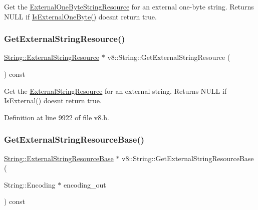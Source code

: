 Get the \mbox{\hyperlink{classv8_1_1String_1_1ExternalOneByteStringResource}{External\+One\+Byte\+String\+Resource}} for an external one-\/byte string. Returns N\+U\+LL if \mbox{\hyperlink{classv8_1_1String_a29b5d1786d906b84e10a5cab9451f976}{Is\+External\+One\+Byte()}} doesn\textquotesingle{}t return true. \mbox{\label{classv8_1_1String_ac751c8c239eb213a879204cab6787883}} 
\subsubsection{\texorpdfstring{Get\+External\+String\+Resource()}{GetExternalStringResource()}}
{\footnotesize\ttfamily \mbox{\hyperlink{classv8_1_1String_1_1ExternalStringResource}{String\+::\+External\+String\+Resource}} $\ast$ v8\+::\+String\+::\+Get\+External\+String\+Resource (\begin{DoxyParamCaption}{ }\end{DoxyParamCaption}) const}

Get the \mbox{\hyperlink{classv8_1_1String_1_1ExternalStringResource}{External\+String\+Resource}} for an external string. Returns N\+U\+LL if \mbox{\hyperlink{classv8_1_1String_a1d24faa97c6168221ec362c395d41ce1}{Is\+External()}} doesn\textquotesingle{}t return true. 

Definition at line 9922 of file v8.\+h.

\mbox{\label{classv8_1_1String_a3031c6406f3f84bbc2d9810477a07489}} 
\subsubsection{\texorpdfstring{Get\+External\+String\+Resource\+Base()}{GetExternalStringResourceBase()}}
{\footnotesize\ttfamily \mbox{\hyperlink{classv8_1_1String_1_1ExternalStringResourceBase}{String\+::\+External\+String\+Resource\+Base}} $\ast$ v8\+::\+String\+::\+Get\+External\+String\+Resource\+Base (\begin{DoxyParamCaption}\item[{String\+::\+Encoding $\ast$}]{encoding\+\_\+out }\end{DoxyParamCaption}) const}

